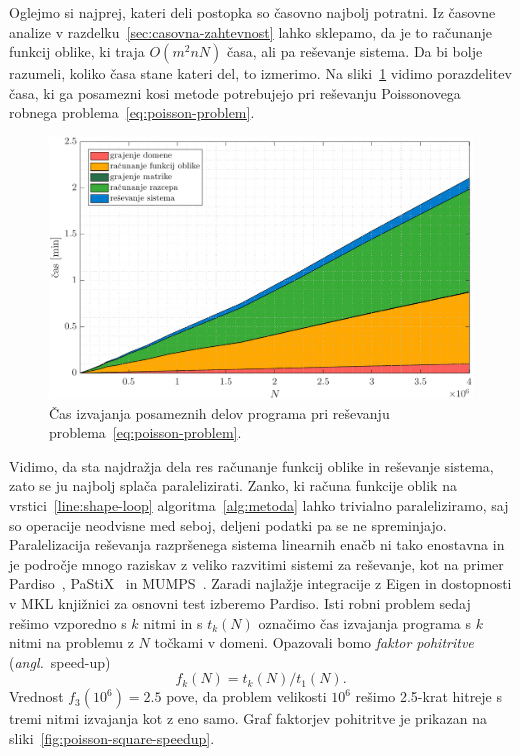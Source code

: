 \documentclass[12pt,a4paper,twoside]{article}
\theoremstyle{definition} %
\theoremstyle{plain} %
\numberwithin{equation}{section}
\newcommand{\ang}[1]{(\hspace{-1.5px}\textit{angl.}\ #1)}
\newlength{\iw}
\begin{document}
Oglejmo si najprej, kateri deli postopka so časovno najbolj potratni. Iz časovne analize v
razdelku~\ref{sec:casovna-zahtevnost} lahko sklepamo, da je to računanje funkcij oblike,
ki traja $O(m^2n N)$ časa, ali pa reševanje sistema. Da bi bolje razumeli, koliko časa stane kateri
del, to izmerimo. Na sliki~\ref{fig:poisson-square-time-distribution} vidimo porazdelitev časa, ki ga posamezni
kosi metode potrebujejo pri reševanju Poissonovega robnega problema~\eqref{eq:poisson-problem}.

\begin{figure}[!h]
  \centering
  \includegraphics[width=\iw]{images/poisson_square_time_distribution_1.pdf}
  \caption[Čas izvajanja delov programa pri reševanju Poissonove enačbe.]{Čas
  izvajanja posameznih delov programa pri reševanju
  problema~\eqref{eq:poisson-problem}.}
  \label{fig:poisson-square-time-distribution}
\end{figure}

Vidimo, da sta najdražja dela res računanje funkcij oblike in reševanje sistema, zato se ju najbolj
splača paralelizirati. Zanko, ki računa funkcije oblik na vrstici~\ref{line:shape-loop}
algoritma~\ref{alg:metoda} lahko trivialno paraleliziramo, saj so operacije neodvisne med seboj,
deljeni podatki pa se ne spreminjajo. Paralelizacija reševanja razpršenega sistema linearnih enačb
ni tako enostavna in je področje mnogo raziskav z veliko razvitimi sistemi za reševanje, kot na
primer Pardiso~\cite{pardiso}, PaStiX~\cite{henon2002pastix} in MUMPS~\cite{amestoy2000mumps}.
Zaradi najlažje integracije z Eigen in dostopnosti v MKL knjižnici za osnovni test izberemo
Pardiso. Isti robni problem sedaj rešimo vzporedno s $k$ nitmi in s $t_k(N)$ označimo
čas izvajanja programa s $k$ nitmi na problemu z $N$ točkami v domeni. Opazovali bomo \emph{faktor
pohitritve} \ang{speed-up}
\begin{equation}
   f_k(N) = t_k(N) / t_1(N).
\end{equation}
Vrednost $f_3(10^6) = 2.5$ pove, da problem velikosti $10^6$ rešimo 2.5-krat hitreje s tremi
nitmi izvajanja kot z eno samo. Graf faktorjev pohitritve je prikazan na
sliki~\ref{fig:poisson-square-speedup}.
\end{document}
